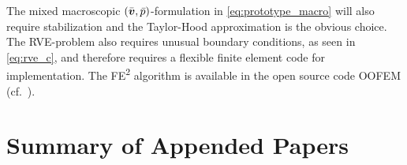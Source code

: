 \documentclass[MikaelDissertation.tex]{subfiles}
\begin{document}
The mixed macroscopic $(\bar{\boldsymbol{v}},\bar{p})$-formulation in \cref{eq:prototype_macro} will also require stabilization and the Taylor-Hood approximation is the obvious choice.
The RVE-problem also requires unusual boundary conditions, as seen in \cref{eq:rve_c}, and therefore requires a flexible finite element code for implementation.
The FE\textsuperscript{2} algorithm is available in the open source code OOFEM (cf.\ \cite{patzak_oofem_2000}).

\chapter{Summary of Appended Papers}
\end{document}
